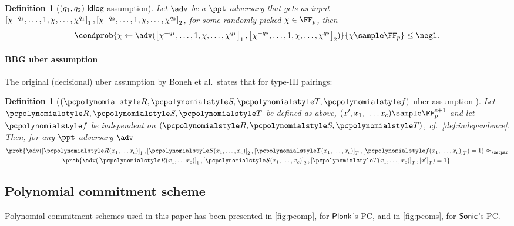 \let\accentvec\vec \documentclass[runningheads]{llncs}
\newtheorem{definition}[theorem]{Definition}
\begin{document}
\begin{definition}[$(q_1, q_2)\text{-}\mathsf{ldlog}$ assumption]
		Let $\adv$ be a $\ppt$ adversary that gets as input $\left[\chi^{-q_1},
		\ldots, 1, \chi, \ldots, \chi^{q_1}\right]_{1}, \left[\chi^{-q_2}, \ldots, 1, \chi, \ldots, \chi^{q_2}\right]_{2}$, for some randomly picked $\chi \in \FF_p$, then
	\[
			\condprob{\chi \gets \adv(\gone{\chi^{-q_1}, \ldots, 1, \chi, \ldots,
			\chi^{q_1}}, \gtwo{\chi^{-q_2}, \ldots, 1, \chi, \ldots, \chi^{q_2} })}{\chi \sample \FF_p} \leq \negl.
	\]
\end{definition}

\paragraph{BBG uber assumption}
The original (decisional) uber assumption by Boneh et al.~states that for
type-III pairings:

\begin{definition}[$(\pR, \pS, \pT, \p{f})$-uber assumption
	\cite{EC:BonBoyGoh05}]
	\label{def:uber_assumption_orig}
	Let $\pR, \pS, \pT$ be defined as above, $(x', x_1, \ldots, x_c) \sample
  \FF_p^{c + 1}$ and let $\p{f}$ be independent on $(\pR, \pS, \pT)$,
  cf.~\cref{def:independence}. Then, for any $\ppt$ adversary $\adv$
	\begin{multline*}
		\prob{\adv(\gone{\pR(x_1, \ldots x_c)}, \gtwo{\pS(x_1, \ldots, x_c)},
		\gtar{\pT(x_1, \ldots, x_c)}, \gtar{\p{f}(x_1, \ldots, x_c)}) = 1} \approx_\secpar \\ 
		\prob{\adv(\gone{\pR(x_1, \ldots x_c)}, \gtwo{\pS(x_1, \ldots, x_c)},
		\gtar{\pT(x_1, \ldots, x_c)}, \gtar{x'}) = 1}.  
	\end{multline*}
\end{definition}

\subsection{Polynomial commitment scheme}
Polynomial commitment schemes used in this paper has been presented in
\cref{fig:pcomp}, for $\textnormal{\textsf{Plonk}}$'s PC, and in \cref{fig:pcoms}, for ${\textnormal{\textsf{Sonic}}}$'s
PC.
\end{document}
